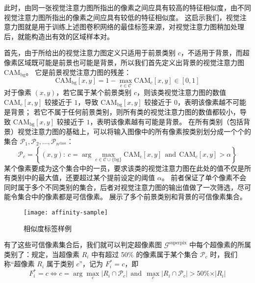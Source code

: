 此时，由同一张视觉注意力图所指出的像素之间应具有较高的特征相似度，由不同视觉注意力图所指出的像素之间应具有较低的特征相似度。
这启示我们，视觉注意力图就是用于训练上述图卷积网络的最佳标签来源，对视觉注意力图稍加处理后，就能构造出有效的区域样本对。
\par
首先，由于所给出的视觉注意力图定义只适用于前景类别 $c$，不适用于背景，而超像素区域既可能是前景也可能是背景，所以我们首先定义出背景的视觉注意力图 $\text{CAM}_\text{bg}$。
它是前景视觉注意力图的残差：
\begin{equation}
\text{CAM}_\text{bg}[x,y] = 1 - \max_{c \in \mathcal{C}} \text{CAM}_c[x,y] \in [0,1]
\end{equation}
对于像素 $(x,y)$，若它属于某个前景类别 $c$，则该类视觉注意力图的数值 $\text{CAM}_c[x,y]$ 较接近于 $1$，导致 $\text{CAM}_\text{bg}[x,y]$ 较接近于 $0$，表明该像素越不可能是背景；
若它不属于任何前景类别，则所有类的视觉注意力图的数值都较小，导致 $\text{CAM}_\text{bg}[x,y]$ 较接近于 $1$，表明该像素越有可能是背景。
在所有类别（包括背景）视觉注意力图的基础上，可以将输入图像中的所有像素按类别划分成一个个的集合 $\mathcal{P}_1, \mathcal{P}_2, \dots, \mathcal{P}_{n^\text{class}}$：
\begin{equation}
\mathcal{P}_c = \left\{ (x,y) :\ c = \arg\max_{ c \in \mathcal{C} \cup \{ \text{bg} \}} \text{CAM}_c[x,y]\ \ \text{and}\ \ \text{CAM}_c[x,y] > \alpha \right\}
\end{equation}
某个像素要成为这个集合中的一员，要求该类的视觉注意力图在此处的值不仅是所有类别中的最大值，还要超过某个提前设定的阈值 $\alpha$。
前者保证了单个像素不会同时属于多个不同类别的集合，后者对视觉注意力图的输出值做了一次筛选，尽可能令集合中的像素都是可信像素。
展示了多个前景类别和背景的可信像素集合。
\par
\begin{figure}[h]
\centering
\texttt{[image: affinity-sample]}
\caption{相似度标签样例}
\label{fig:affinity-sample}
\end{figure}
\par
有了这些可信像素集合后，我们就可以判定超像素图 $\mathcal{G}^\text{superpix}$ 中每个超像素的所属类别了：规定，当超像素 $R_i$ 中有超过 50\% 的像素属于某个集合 $\mathcal{P}_c$ 时，我们称“超像素 $R_i$ 属于类别 $c$”，记为 $F^{*}_i = c$，即
\begin{equation}
F^{*}_i = c
\iff
c = \arg\max\limits_c \vert R_i \cap \mathcal{P}_c \vert\ \ \text{and}\ \ \max\limits_c \vert R_i \cap \mathcal{P}_c \vert > 50\% \times \vert R_i \vert
\end{equation}
